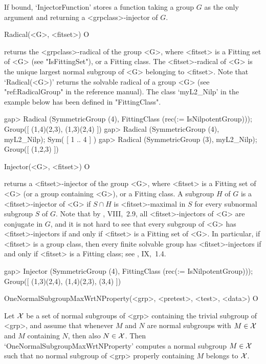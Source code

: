 If bound, `InjectorFunction' stores a function taking a group $G$ as the
only argument and returning a <grpclass>-injector of $G$.


\>Radical(<G>,  <fitset>) O

returns the <grpclass>-radical of the group <G>, where
<fitset> is a Fitting set of <G> (see "IsFittingSet"), or a Fitting
class. The <fitset>-radical of <G> is the unique largest normal subgroup
of <G> belonging to <fitset>. Note that `Radical(<G>)' returns the solvable
radical of a group <G> (see "ref:RadicalGroup" in the {\GAP} reference
manual). The class `myL2_Nilp' in the example below has been defined in "FittingClass".

\beginexample
gap> Radical (SymmetricGroup (4), FittingClass (rec(\in := IsNilpotentGroup)));
Group([ (1,4)(2,3), (1,3)(2,4) ])
gap> Radical (SymmetricGroup (4), myL2_Nilp);
Sym( [ 1 .. 4 ] ) 
gap> Radical (SymmetricGroup (3), myL2_Nilp);
Group([ (1,2,3) ])
\endexample

\>Injector(<G>, <fitset>) O

returns a <fitset>-injector of the group <G>, where <fitset> is a
Fitting set of <G> (or a group containing <G>), or a Fitting class. A
subgroup $H$ of $G$ is a <fitset>-injector of <G> if $S \cap H$ is
<fitset>-maximal in $S$ for every subnormal subgroup $S$ of $G$. Note that by 
\cite{DH1992}, VIII,~2.9, all <fitset>-injectors of <G> are conjugate in $G$,
and it is not hard to see that every subgroup of <G> has <fitset>-injectors
if and only if <fitset> is a Fitting set of <G>. In particular, if <fitset>
is a group class, then every finite
solvable group has <fitset>-injectors if and only if <fitset> is a Fitting
class; see \cite{DH1992}, IX,~1.4.

\beginexample
gap> Injector (SymmetricGroup (4), FittingClass (rec(\in := IsNilpotentGroup)));
Group([ (1,3)(2,4), (1,4)(2,3), (3,4) ])
\endexample



\null


\>OneNormalSubgroupMaxWrtNProperty(<grp>, <pretest>, <test>, <data>) O

Let $\cal X$ be a set of normal subgroups of <grp> containing the trivial
subgroup of <grp>, and assume that whenever
$M$ and $N$ are normal subgroups with $M \in \cal X$ and $M$
containing $N$, then also $N \in \cal X$. Then
`OneNormalSubgroupMaxWrtNProperty' computes a normal subgroup $M \in \cal X$
such that no normal subgroup of <grp> properly containing $M$ belongs to $\cal
X$. 

